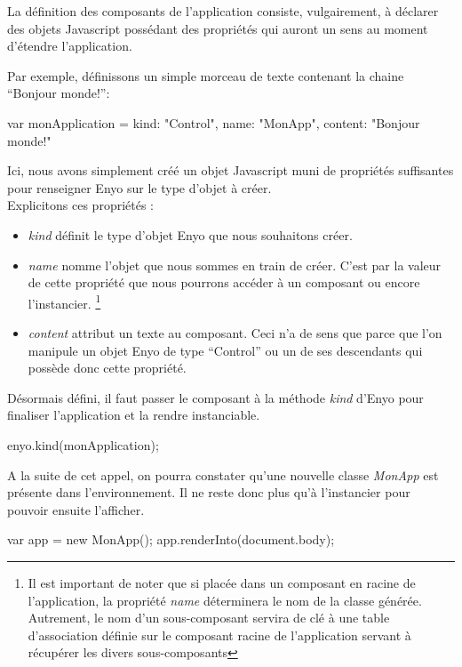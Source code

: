 \documentclass[11pt,a4paper]{report}
\begin{document}
La définition des composants de l'application consiste, vulgairement, à déclarer 
des objets Javascript possédant des propriétés qui auront un sens au moment d'étendre
l'application.\smallskip

Par exemple, définissons un simple morceau de texte contenant la chaine ``Bonjour monde!'':
\begin{JavaScript}
  var monApplication = {kind: "Control",
                        name: "MonApp",
                        content: "Bonjour monde!"}
\end{JavaScript}

Ici, nous avons simplement créé un objet Javascript muni de propriétés suffisantes 
pour renseigner Enyo sur le type d'objet à créer.\\
Explicitons ces propriétés :
\begin{itemize}
\item \emph{kind} définit le type d'objet Enyo que nous souhaitons créer.\smallskip
\item \emph{name} nomme l'objet que nous sommes en train de créer. C'est par la
valeur de cette propriété que nous pourrons accéder à un composant ou encore l'instancier.
\footnote{Il est important de noter que si placée dans un composant en racine de l'application,
la propriété \emph{name} déterminera le nom de la classe générée. Autrement, le nom d'un sous-composant
servira de clé à une table d'association définie sur le composant racine de l'application 
servant à récupérer les divers sous-composants
}\smallskip
\item \emph{content} attribut un texte au composant. Ceci n'a de sens que parce que l'on manipule
un objet Enyo de type ``Control'' ou un de ses descendants qui possède donc cette propriété.\smallskip
\end{itemize}\medskip

Désormais défini, il faut passer le composant à la méthode \emph{kind} d'Enyo pour finaliser l'application
et la rendre instanciable.

\begin{JavaScript}
  enyo.kind(monApplication);
\end{JavaScript}

A la suite de cet appel, on pourra constater qu'une nouvelle classe \mbox{\emph{MonApp}} est présente 
dans l'environnement. Il ne reste donc plus qu'à l'instancier pour pouvoir ensuite l'afficher.

\clearpage

\begin{JavaScript}
  var app = new MonApp();
  app.renderInto(document.body);
\end{JavaScript}
\end{document}
